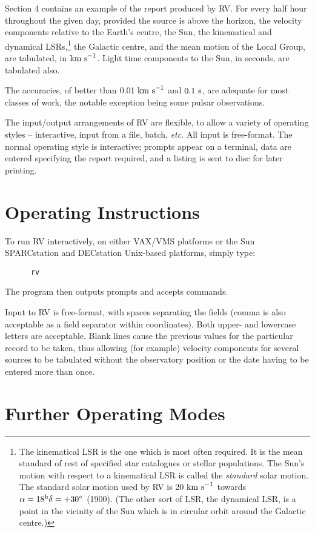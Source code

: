 Section 4 contains an example of the report produced by RV.
For every half hour throughout the given day, provided the source is above the
horizon, the velocity components relative to the Earth's centre, the Sun, the
kinematical and dynamical LSRs,\footnote{The kinematical LSR is the
one which is most often required.  It is the mean standard of
rest of specified star catalogues or
stellar populations.  The Sun's motion with respect to a
kinematical LSR is called the {\it standard}\/ solar motion.
The standard solar motion used by RV is
$20~{\rm km~s}^{-1}$ towards $\alpha=18^{\rm h} \delta=+30^{\circ}$
(1900). (The other sort of LSR, the dynamical LSR, is a point in the
vicinity of the Sun which is in circular orbit around the
Galactic centre.)}
the Galactic centre, and the mean motion of the Local
Group, are tabulated, in ${\rm km~s}^{-1}$. 
Light time components to the Sun, in seconds, are tabulated also.

The accuracies, of better than $0.01~{\rm km~s}^{-1}$ and $0.1~{\rm s}$, are
adequate for most classes of work, the notable exception
being some pulsar observations.

The input/output arrangements of RV are flexible, to allow a variety of
operating styles -- interactive, input from a file, batch, {\it etc}.
All input is free-format.
The normal operating style is interactive; prompts appear on a terminal, data
are entered specifying the report required, and a listing is sent to disc for
later printing.

\section{Operating Instructions}

To run RV interactively, on either VAX/VMS platforms or
the Sun SPARCstation and DECstation Unix-based platforms, simply type:
\begin{verbatim}
      rv
\end{verbatim}
The program then outputs prompts and accepts commands.

Input to RV is free-format, with spaces separating the fields (comma is also
acceptable as a field separator within coordinates).
Both upper- and lowercase letters are acceptable.
Blank lines cause the previous values for the particular record to be taken,
thus allowing (for example) velocity components for several sources to be
tabulated without the observatory position or the date having to be entered more
than once.

\section{Further Operating Modes}

